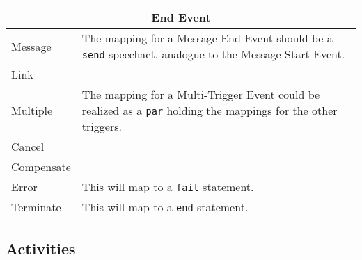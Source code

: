 \begin{longtable}{|p{3.5cm}|p{10.5cm}|}
\hline
\multicolumn{2}{|c|}{\textbf{End Event}}
\\\hline
Message                 & The mapping for a Message End Event should be a \verb|send| speechact, analogue to the Message Start Event.
\\\hline
Link                    & 
\\\hline
Multiple                & The mapping for a Multi-Trigger Event could be realized as a \verb|par| holding the mappings for the other triggers.
\\\hline
Cancel                  & 
\\\hline
Compensate              & 
\\\hline
Error                   & This will map to a \verb|fail| statement.
\\\hline
Terminate               & This will map to a \verb|end| statement.
\\\hline
\end{longtable}


\subsection{Activities}


